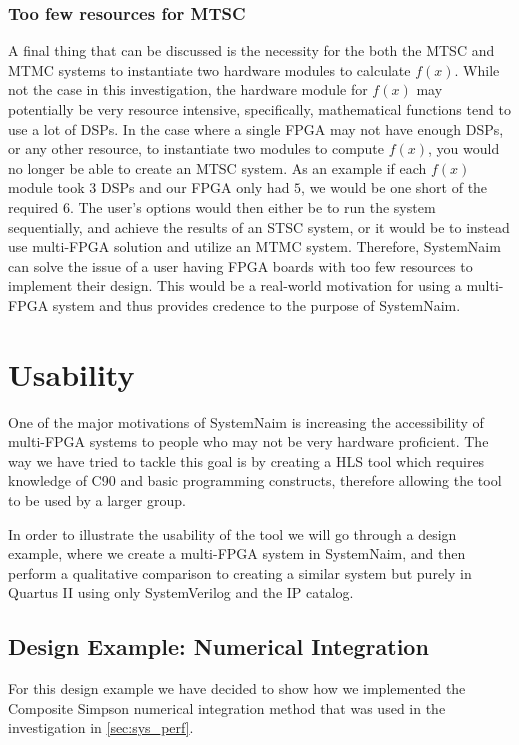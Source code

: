 \subsubsection{Too few resources for MTSC}

A final thing that can be discussed is the necessity for the both the MTSC and MTMC systems to instantiate two hardware modules to calculate $f(x)$. While not the case in this investigation, the hardware module for $f(x)$ may potentially be very resource intensive, specifically, mathematical functions tend to use a lot of DSPs. In the case where a single FPGA may not have enough DSPs, or any other resource, to instantiate two modules to compute $f(x)$, you would no longer be able to create an MTSC system. As an example if each $f(x)$ module took 3 DSPs and our FPGA only had $5$, we would be one short of the required $6$. The user's options would then either be to run the system sequentially, and achieve the results of an STSC system, or it would be to instead use multi-FPGA solution and utilize an MTMC system. Therefore, SystemNaim can solve the issue of a user having FPGA boards with too few resources to implement their design. This would be a real-world motivation for using a multi-FPGA system and thus provides credence to the purpose of SystemNaim.

\section{Usability}
\label{sec:usability}

One of the major motivations of SystemNaim is increasing the accessibility of multi-FPGA systems to people who may not be very hardware proficient. The way we have tried to tackle this goal is by creating a HLS tool which requires knowledge of C90 and basic programming constructs, therefore allowing the tool to be used by a larger group. 

In order to illustrate the usability of the tool we will go through a design example, where we create a multi-FPGA system in SystemNaim,  and then perform a qualitative comparison to creating a similar system but purely in Quartus II using only SystemVerilog and the IP catalog.

\subsection{Design Example: Numerical Integration}
\label{sec:design_example}


For this design example we have decided to show how we implemented the Composite Simpson numerical integration method that was used in the investigation in \autoref{sec:sys_perf}.


